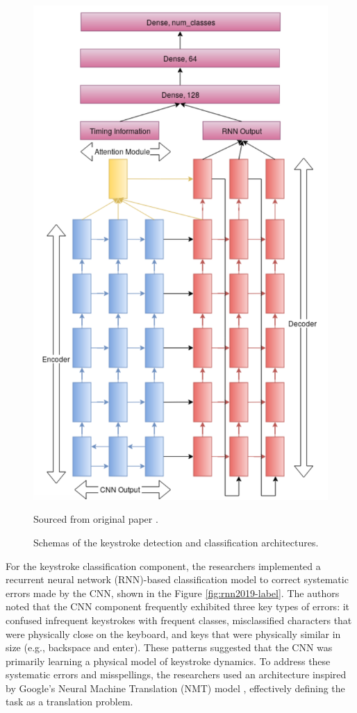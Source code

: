 \documentclass[a4paper,11pt,twoside]{report}
\theoremstyle{definition}
\begin{document}
\begin{figure}[h!]
\begin{minipage}{0.41\linewidth}
      \includegraphics[width=\linewidth]{img_related_work/rnn2019.png}
      \label{fig:rnn2019-label}
  \end{minipage}
  \caption{Schemas of the keystroke detection and classification architectures.}
  \footnotesize{Sourced from original paper \cite{cnn2019noise}.}
  \label{fig:enter-label}
\end{figure}

For the keystroke classification component, the researchers implemented a recurrent neural network (RNN)-based classification model to correct systematic errors made by the CNN, shown in the Figure \ref{fig:rnn2019-label}. The authors noted that the CNN component frequently exhibited three key types of errors: it confused infrequent keystrokes with frequent classes, misclassified characters that were physically close on the keyboard, and keys that were physically similar in size (e.g., backspace and enter). These patterns suggested that the CNN was primarily learning a physical model of keystroke dynamics. To address these systematic errors and misspellings, the researchers used an architecture inspired by Google's Neural Machine Translation (NMT) model \cite{nmt}, effectively defining the task as a translation problem.
\end{document}
